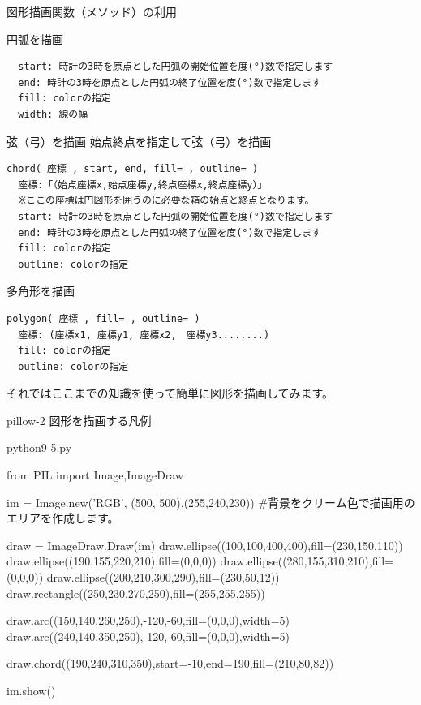 \documentclass[11pt,a4paper,dvipdfmx,titlepage]{jsreport}
\begin{document}
\begin{grabox}{図形描画関数（メソッド）の利用}
\begin{codebox}{円弧を描画}
\begin{verbatim}
  start: 時計の3時を原点とした円弧の開始位置を度(°)数で指定します
  end: 時計の3時を原点とした円弧の終了位置を度(°)数で指定します
  fill: colorの指定
  width: 線の幅
\end{verbatim}
\end{codebox}
\begin{codebox}{弦（弓）を描画}
始点終点を指定して弦（弓）を描画
\begin{verbatim}
chord( 座標 , start, end, fill= , outline= )
  座標:「（始点座標x,始点座標y,終点座標x,終点座標y）」
  ※ここの座標は円図形を囲うのに必要な箱の始点と終点となります。
  start: 時計の3時を原点とした円弧の開始位置を度(°)数で指定します
  end: 時計の3時を原点とした円弧の終了位置を度(°)数で指定します
  fill: colorの指定
  outline: colorの指定
\end{verbatim}
\end{codebox}
\begin{codebox}{多角形を描画}
\begin{verbatim}
polygon( 座標 , fill= , outline= )
  座標: (座標x1, 座標y1, 座標x2,　座標y3........)
  fill: colorの指定
  outline: colorの指定
\end{verbatim}
\end{codebox}
\end{grabox}

\newpage

それではここまでの知識を使って簡単に図形を描画してみます。

\begin{pabox}{pillow-2}
図形を描画する凡例


\begin{codebox}{python9-5.py}
\begin{listing}{1}
from PIL import Image,ImageDraw

im = Image.new('RGB', (500, 500),(255,240,230))
#背景をクリーム色で描画用のエリアを作成します。

draw = ImageDraw.Draw(im)
draw.ellipse((100,100,400,400),fill=(230,150,110))
draw.ellipse((190,155,220,210),fill=(0,0,0))
draw.ellipse((280,155,310,210),fill=(0,0,0))
draw.ellipse((200,210,300,290),fill=(230,50,12))
draw.rectangle((250,230,270,250),fill=(255,255,255))

draw.arc((150,140,260,250),-120,-60,fill=(0,0,0),width=5)
draw.arc((240,140,350,250),-120,-60,fill=(0,0,0),width=5)

draw.chord((190,240,310,350),start=-10,end=190,fill=(210,80,82))

im.show()

\end{listing}
\end{codebox}
\end{pabox}
\end{document}
